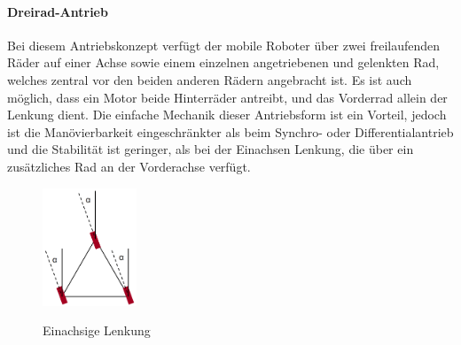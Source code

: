 \paragraph{Dreirad-Antrieb}
Bei diesem Antriebskonzept verfügt der mobile Roboter über zwei freilaufenden Räder auf einer Achse sowie einem einzelnen angetriebenen und gelenkten Rad, welches zentral vor den beiden anderen Rädern angebracht ist. Es ist auch möglich, dass ein Motor beide Hinterräder antreibt, und das Vorderrad allein der Lenkung dient.
\newline
Die einfache Mechanik dieser Antriebsform ist ein Vorteil, jedoch ist die Manövierbarkeit eingeschränkter als beim Synchro- oder Differentialantrieb und die Stabilität ist geringer, als bei der Einachsen Lenkung, die über ein zusätzliches Rad an der Vorderachse verfügt.
\begin{figure}
	\vspace{-0.8cm}
	\begin{center}
		\includegraphics[width=0.25\textwidth]{images/technische_grundlagen/Synchroantrieb.png}
	\end{center}
	\caption{Einachsige Lenkung}
	\cite{MarkusStrand.Robotikscript}
	\label{fig:einachsenlenkung}
\end{figure}
